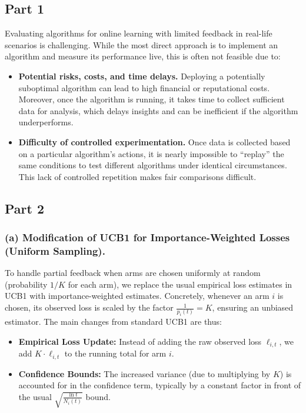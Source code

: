 \subsection{Part 1}

Evaluating algorithms for online learning with limited feedback in real-life scenarios is challenging. 
While the most direct approach is to implement an algorithm and measure its performance live, this is often not feasible due to:

\begin{itemize}
    \item \textbf{Potential risks, costs, and time delays.} Deploying a potentially suboptimal algorithm can lead to high financial or reputational costs. Moreover, once the algorithm is running, it takes time to collect sufficient data for analysis, which delays insights and can be inefficient if the algorithm underperforms.

    \item \textbf{Difficulty of controlled experimentation.} Once data is collected based on a particular algorithm's actions, it is nearly impossible to ``replay'' the same conditions to test different algorithms under identical circumstances. This lack of controlled repetition makes fair comparisons difficult.
\end{itemize}

\subsection{Part 2}

\noindent
\subsubsection*{(a) Modification of UCB1 for Importance-Weighted Losses (Uniform Sampling).}

\medskip
To handle partial feedback when arms are chosen uniformly at random (probability $1/K$ for each arm), we replace the usual empirical loss estimates in UCB1 with importance-weighted estimates. Concretely, whenever an arm $i$ is chosen, its observed loss is scaled by the factor $\tfrac{1}{p_i(t)} = K$, ensuring an unbiased estimator. The main changes from standard UCB1 are thus:
\begin{itemize}
    \item \textbf{Empirical Loss Update:} Instead of adding the raw observed loss $\ell_{i,t}$, we add $K \cdot \ell_{i,t}$ to the running total for arm $i$. 
    \item \textbf{Confidence Bounds:} The increased variance (due to multiplying by $K$) is accounted for in the confidence term, typically by a constant factor in front of the usual $\sqrt{\frac{\ln t}{N_i(t)}}$ bound. 
\end{itemize}

